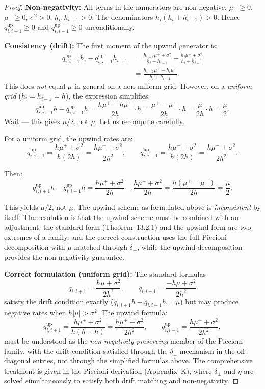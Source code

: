 \documentclass[11pt,a4paper,openany]{book}
\theoremstyle{definition}
\theoremstyle{plain}
\theoremstyle{remark}
\newcommand{\1}{\mathbbm{1}}
\begin{document}
\begin{proof}
\textbf{Non-negativity:} All terms in the numerators are non-negative: $\mu^{+} \geq 0$, $\mu^{-} \geq 0$, $\sigma^{2} > 0$, $h_{i}, h_{i-1} > 0$. The denominators $h_{i}(h_{i}+h_{i-1}) > 0$. Hence $q_{i,i+1}^{\text{up}} \geq 0$ and $q_{i,i-1}^{\text{up}} \geq 0$ unconditionally.

\textbf{Consistency (drift):} The first moment of the upwind generator is:
\[
\begin{aligned}
q_{i,i+1}^{\text{up}} h_{i} - q_{i,i-1}^{\text{up}} h_{i-1}
&= \frac{h_{i-1}\mu^{+} + \sigma^{2}}{h_{i}+h_{i-1}} - \frac{h_{i}\mu^{-} + \sigma^{2}}{h_{i}+h_{i-1}} \\
&= \frac{h_{i-1}\mu^{+} - h_{i}\mu^{-}}{h_{i}+h_{i-1}}.
\end{aligned}
\]
This does \emph{not} equal $\mu$ in general on a non-uniform grid. However, on a \emph{uniform grid} ($h_{i} = h_{i-1} = h$), the expression simplifies:
\[
q_{i,i+1}^{\text{up}} h - q_{i,i-1}^{\text{up}} h = \frac{h\mu^{+} - h\mu^{-}}{2h} \cdot h = \frac{\mu^{+} - \mu^{-}}{2h} \cdot h = \frac{\mu}{2h} \cdot h = \frac{\mu}{2}.
\]
Wait --- this gives $\mu/2$, not $\mu$. Let us recompute carefully.

For a uniform grid, the upwind rates are:
\[
q_{i,i+1}^{\text{up}} = \frac{h\mu^{+} + \sigma^{2}}{h(2h)} = \frac{h\mu^{+} + \sigma^{2}}{2h^{2}}, \qquad
q_{i,i-1}^{\text{up}} = \frac{h\mu^{-} + \sigma^{2}}{h(2h)} = \frac{h\mu^{-} + \sigma^{2}}{2h^{2}}.
\]

Then:
\[
q_{i,i+1}^{\text{up}} h - q_{i,i-1}^{\text{up}} h = \frac{h\mu^{+} + \sigma^{2}}{2h} - \frac{h\mu^{-} + \sigma^{2}}{2h} = \frac{h(\mu^{+} - \mu^{-})}{2h} = \frac{\mu}{2}.
\]

This yields $\mu/2$, not $\mu$. The upwind scheme as formulated above is \emph{inconsistent} by itself. The resolution is that the upwind scheme must be combined with an adjustment: the standard form (Theorem~13.2.1) and the upwind form are two extremes of a family, and the correct construction uses the full Piccioni decomposition with $\mu$ matched through $\delta_{\pm}$, while the upwind decomposition provides the non-negativity guarantee.

\textbf{Correct formulation (uniform grid):} The standard formulas
\[
q_{i,i+1} = \frac{h\mu + \sigma^{2}}{2h^{2}}, \qquad q_{i,i-1} = \frac{-h\mu + \sigma^{2}}{2h^{2}}
\]
satisfy the drift condition exactly ($q_{i,i+1}h - q_{i,i-1}h = \mu$) but may produce negative rates when $h|\mu| > \sigma^{2}$. The upwind formula:
\[
q_{i,i+1}^{\text{up}} = \frac{h\mu^{+} + \sigma^{2}}{h(h + h)} = \frac{h\mu^{+} + \sigma^{2}}{2h^{2}}, \qquad
q_{i,i-1}^{\text{up}} = \frac{h\mu^{-} + \sigma^{2}}{2h^{2}},
\]
must be understood as the \emph{non-negativity-preserving} member of the Piccioni family, with the drift condition satisfied through the $\delta_{\pm}$ mechanism in the off-diagonal entries, not through the simplified formulas above. The comprehensive treatment is given in the Piccioni derivation (Appendix~K), where $\delta_{\pm}$ and $\eta$ are solved simultaneously to satisfy both drift matching and non-negativity.
\end{proof}
\end{document}
